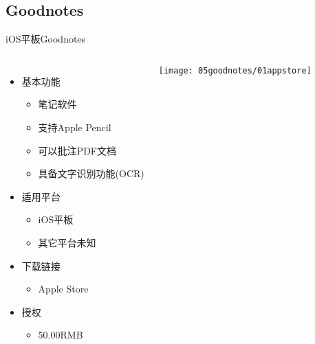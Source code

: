 \documentclass[fontset = none, t, aspectratio=169]{ctexbeamer}
\begin{document}
\subsection{Goodnotes}
\begin{frame}{iOS平板}{Goodnotes}
  \begin{columns}[c]
    \begin{itemize}\itemsep=3pt
    \item 基本功能
      \begin{itemize}
      \item 笔记软件
      \item 支持Apple Pencil
      \item 可以\alert{批注}PDF文档
      \item 具备文字识别功能(OCR)
      \end{itemize}
    \item 适用平台
      \begin{itemize}
      \item iOS平板
      \item 其它平台未知
      \end{itemize}
    \item 下载链接
      \begin{itemize}
      \item Apple Store
      \end{itemize}
    \item 授权
      \begin{itemize}
      \item \alert{50.00RMB}
      \end{itemize}
    \end{itemize}
    \texttt{[image: 05goodnotes/01appstore]}
  \end{columns}
\end{frame}
\end{document}
